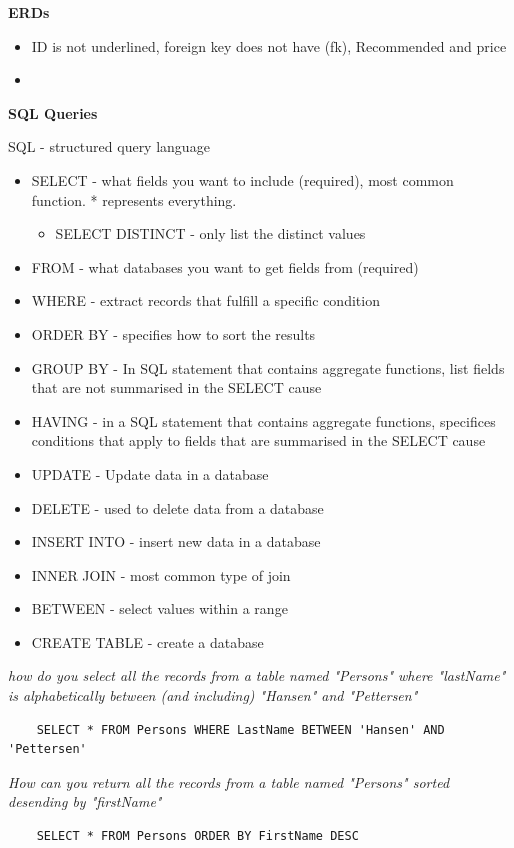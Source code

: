 \documentclass[12pt, a4, twoside]{article}
\begin{document}
\begin{center}
\begin{itemize}
    \textbf{ERDs}
    \begin{itemize}
      \item ID is not underlined, foreign key does not have (fk), Recommended and price
      \item 
    \end{itemize}

  \end{itemize}

  
  \item \textbf{SQL Queries}
  \item SQL - structured query language 
  \begin{itemize}
    \item SELECT - what fields you want to include (required), most common function. * represents everything. 
    \begin{itemize}
      \item SELECT DISTINCT - only list the distinct values
    \end{itemize}
    \item FROM - what databases you want to get fields from (required)
    \item WHERE - extract records that fulfill a specific condition 
    \item ORDER BY - specifies how to sort the results 
    \item GROUP BY - In SQL statement that contains aggregate functions, list fields that are not summarised in the SELECT cause
    \item HAVING - in a SQL statement that contains aggregate functions, specifices conditions that apply to fields that are summarised in the SELECT cause
    \item UPDATE - Update data in a database 
    \item DELETE - used to delete data from a database 
    \item INSERT INTO - insert new data in a database 
    \item INNER JOIN - most common type of join
    \item BETWEEN - select values within a range
    \item CREATE TABLE - create a database
  \end{itemize}
  \textit{how do you select all the records from a table named "Persons" where "lastName" is alphabetically between (and including) "Hansen" and "Pettersen"}
  \begin{verbatim}
    SELECT * FROM Persons WHERE LastName BETWEEN 'Hansen' AND 'Pettersen'
  \end{verbatim}
  \textit{How can you return all the records from a table named "Persons" sorted desending by "firstName"}
  \begin{verbatim}
    SELECT * FROM Persons ORDER BY FirstName DESC
  \end{verbatim}
\end{center}
\end{document}
